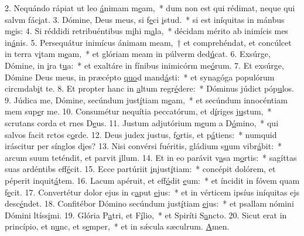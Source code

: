 2. Nequándo rápiat ut leo \uline{á}nimam m\uline{e}am,~* dum non est qui rédimat, neque qui salvm fác\uline{i}at.
3. Dómine, Deus meus, si f\uline{e}ci \uline{i}stud.~* si est iníquitas in mánbus m\uline{e}is:
4. Si réddidi retribuéntibus m\uline{i}hi m\uline{a}la,~* décidam mérito ab inimícis mes in\uline{á}nis.
5. Persequátur inimícus ánimam meam,~† et comprehéndat, et concúlcet in terra v\uline{i}tam m\uline{e}am,~* et glóriam meam in púlverm ded\uline{ú}cat.
6. Exsúrge, Dómine, in \uline{i}ra t\uline{u}a:~* et exaltáre in fínibus inimicórm me\uline{ó}rum.
7. Et exsúrge, Dómine Deus meus, in præcépto \uline{quo}d mand\uline{á}sti:~* et synagóga populórum circmdab\uline{i}t te.
8. Et propter hanc in \uline{a}ltum regr\uline{é}dere:~* Dóminus júdict póp\uline{u}los.
9. Júdica me, Dómine, secúndum just\uline{í}tiam m\uline{e}am,~* et secúndum innocéntiam mem sup\uline{e}r me.
10. Consumétur nequítia peccatórum, et d\uline{í}riges j\uline{u}stum,~* scrutans corda et rnes D\uline{e}us.
11. Justum adjutórium m\uline{e}um a D\uline{ó}mino,~* qui salvos facit rctos c\uline{o}rde.
12. Deus judex justus, f\uline{o}rtis, et p\uline{á}tiens:~* numquid iráscitur per sínglos d\uline{i}es?
13. Nisi convérsi fuéritis, gládium s\uline{u}um vibr\uline{á}bit:~* arcum suum teténdit, et parvit \uline{i}llum.
14. Et in eo parávit v\uline{a}sa m\uline{o}rtis:~* sagíttas suas ardéntibs eff\uline{é}cit.
15. Ecce partúriit \uline{i}njust\uline{í}tiam:~* concépit dolórem, et péperit inquit\uline{á}tem.
16. Lacum apéruit, et eff\uline{ó}dit \uline{e}um:~* et íncidit in fóvem quam f\uline{e}cit.
17. Convertétur dolor ejus in c\uline{a}put \uline{e}jus:~* et in vérticem ipsíus iníquitas ejs desc\uline{é}ndet.
18. Confitébor Dómino secúndum just\uline{í}tiam \uline{e}jus:~* et psallam nómini Dómini ltíss\uline{i}mi.
19. Glória P\uline{a}tri, et F\uline{í}lio,~* et Spiríti S\uline{a}ncto.
20. Sicut erat in princípio, et n\uline{u}nc, et s\uline{e}mper,~* et in sǽcula sæculrum. \uline{A}men.
